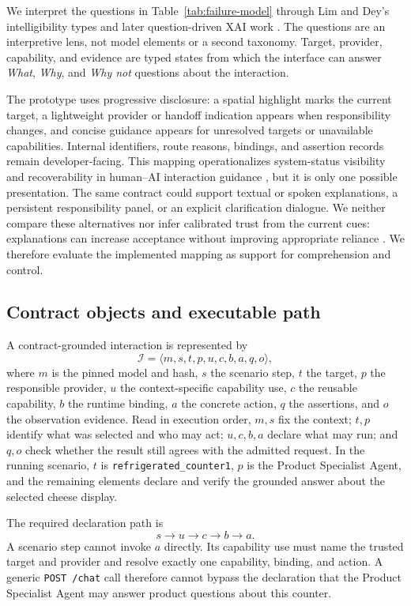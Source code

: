 We interpret the questions in Table~\ref{tab:failure-model} through Lim and
Dey's intelligibility types and later question-driven XAI work
\cite{lim2009demand,liao2020questioning}.  The questions are an interpretive
lens, not model elements or a second taxonomy.  Target, provider, capability,
and evidence are typed states from which the interface can answer
\emph{What}, \emph{Why}, and \emph{Why not} questions about the interaction.

The prototype uses progressive disclosure: a spatial highlight marks the
current target, a lightweight provider or handoff indication appears when
responsibility changes, and concise guidance appears for unresolved targets or
unavailable capabilities.  Internal identifiers, route reasons, bindings, and
assertion records remain developer-facing.  This mapping operationalizes
system-status visibility and recoverability in human--AI interaction guidance
\cite{amershi2019guidelines}, but it is only one possible presentation.  The
same contract could support textual or spoken explanations, a persistent
responsibility panel, or an explicit clarification dialogue.  We neither
compare these alternatives nor infer calibrated trust from the current cues:
explanations can increase acceptance without improving appropriate reliance
\cite{bansal2021whole}.  We therefore evaluate the implemented mapping as
support for comprehension and control.

\subsection{Contract objects and executable path}

A contract-grounded interaction is represented by
\[
\mathcal{I} =
\langle m,s,t,p,u,c,b,a,q,o\rangle ,
\]
where \(m\) is the pinned model and hash, \(s\) the scenario step, \(t\) the
target, \(p\) the responsible provider, \(u\) the context-specific capability
use, \(c\) the reusable capability, \(b\) the runtime binding, \(a\) the
concrete action, \(q\) the assertions, and \(o\) the observation evidence.
Read in execution order, \(m,s\) fix the context; \(t,p\) identify what was
selected and who may act; \(u,c,b,a\) declare what may run; and \(q,o\) check
whether the result still agrees with the admitted request.  In the running
scenario, \(t\) is \texttt{refrigerated\_counter1}, \(p\) is the Product
Specialist Agent, and the remaining elements declare and verify the grounded
answer about the selected cheese display.

The required declaration path is
\[
s \rightarrow u \rightarrow c \rightarrow b \rightarrow a.
\]
A scenario step cannot invoke \(a\) directly.  Its capability use must name the
trusted target and provider and resolve exactly one capability, binding, and
action.  A generic \texttt{POST /chat} call therefore cannot bypass the
declaration that the Product Specialist Agent may answer product questions
about this counter.

